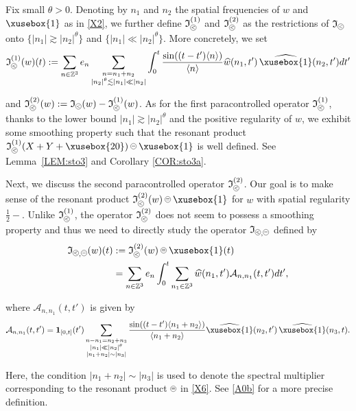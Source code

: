 \documentclass[%
11pt,  reqno]{amsart}
\def\<#1>{\xusebox{#1}}
\newcommand{\pe}{\mathbin{\scaleobj{0.7}{\tikz \draw (0,0) node[shape=circle,draw,inner sep=0pt,minimum size=8.5pt] {\scriptsize  $=$};}}}
\newcommand{\pl}{\mathbin{\scaleobj{0.7}{\tikz \draw (0,0) node[shape=circle,draw,inner sep=0pt,minimum size=8.5pt] {\scriptsize $<$};}}}
\newcommand{\1}{\hspace{0.2mm}\text{I}\hspace{0.2mm}}
\newcommand{\noi}{\noindent}
\newcommand{\Z}{\mathbb{Z}}
\newcommand{\ft}{\widehat}
\newcommand{\les}{\lesssim}
\newcommand{\ges}{\gtrsim}
\newcommand{\jb}[1]
{\langle #1 \rangle}
\newcommand{\ind}{\mathbf 1}
\newcommand{\If}{\mathfrak{I}}
\newcommand{\A}{\mathcal{A}}
\numberwithin{equation}{section}
\numberwithin{theorem}{section}
\begin{document}
Fix small $\theta  > 0$.
Denoting by $n_1$ and $n_2$ the spatial frequencies
of $w$ and $\<1>$ as in \eqref{X2}, 
we further define $ \If_{\pl}^{(1)}$ and $ \If_{\pl}^{(2)}$ 
as the restrictions of $\If_{\pl}$ onto $\{ |n_1| \ges |n_2|^{\theta}\}$
and  $\{ |n_1| \ll |n_2|^{\theta}\}$.
More concretely, we set 
\begin{align}
 \If_{\pl}^{(1)}(w)(t) 
: = \sum_{n \in \Z^3}
e_n  \sum_{\substack{n =  n_1 +  n_2\\    |n_2|^\theta \les |n_1| \ll |n_2|}}
\int_0^t \frac{\sin ((t - t') \jb{n})}{\jb{n}} 
\ft w(n_1, t')\,  \ft{ \<1>}(n_2, t') dt'
\label{X3}
\end{align}

\noi
and $ \If_{\pl}^{(2)}(w)   := \If_{\pl}(w) - \If_{\pl}^{(1)}(w)$.
As for the first paracontrolled operator $ \If_{\pl}^{(1)}$, 
thanks to the lower bound  $|n_1| \ges |n_2|^\theta$ 
 and the positive regularity of $w$, 
we exhibit some smoothing property
such that 
 the resonant product 
$ \If_{\pl}^{(1)}(X+Y+\<20>) \pe \<1>$ is well defined.
See Lemma~\ref{LEM:sto3}
and Corollary \ref{COR:sto3a}.


Next, we discuss the second paracontrolled operator $ \If_{\pl}^{(2)}$.
Our goal is to make sense of the resonant product
$  \If_{\pl}^{(2)}(w)\pe\<1>$
for $w$ with spatial regularity $\frac 12-$.
Unlike $ \If_{\pl}^{(1)}$, 
the operator  $ \If_{\pl}^{(2)}$ does not seem to possess a smoothing property
and thus we need to directly study the  operator $\If_{\pl, \pe}$ defined by
\begin{align}
\begin{split}
\If_{\pl, \pe}(w) (t)
 & :=
  \If_{\pl}^{(2)}(w)\pe\<1>(t) \\
&  = \sum_{n \in \Z^3}e_n 
    \int_0^{t} 
\sum_{n_1 \in \Z^3}
\ft w(n_1, t') \A_{n, n_1} (t, t') dt', 
\end{split}
\label{X6}
\end{align}

\noi
where $\A_{n, n_1} (t, t')$ is given by 
\begin{align}
\A_{n, n_1} (t, t')
= \ind_{[0 , t]}(t') \sum_{\substack{n - n_1 =  n_2 + n_3\\ |n_1| \ll |n_2|^\theta \\ |n_1 + n_2|\sim |n_3|}}
 \frac{\sin ((t - t') \jb{n_1 + n_2 })}{\jb{ n_1 + n_2 }} 
   \ft{\<1>}(n_2, t')\,   \ft{\<1>}(n_3, t) .
\label{X7}
\end{align}

\noi
Here, 
the condition  $ |n_1 + n_2|\sim |n_3|$
is used to denote the  spectral multiplier corresponding 
to the resonant product $\pe$ in \eqref{X6}.
See \eqref{A0b} for a more precise  definition.
\end{document}
